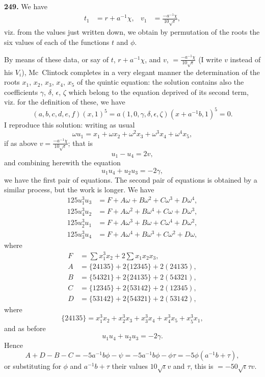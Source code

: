 \documentclass[12pt,a4paper]{article}
\theoremstyle{definition}
\begin{document}
\vspace{0.5em}

\noindent\textbf{249.} We have
\begin{align*}
t_1 &= r + a^{-1}\chi, & v_1 &= \frac{-a^{-1}\chi}{10\sqrt{\iota}},
\end{align*}
viz. from the values just written down, we obtain by permutation of the roots the six values of each of the functions $t$ and $\phi$.

By means of these data, or say of $t$, $r + a^{-1}\chi$, and $v$, $= \frac{-a^{-1}\chi}{10\sqrt{\iota}}$ (I write $v$ instead of his $V_i$), Mc~Clintock completes in a very elegant manner the determination of the roots $x_1$, $x_2$, $x_3$, $x_4$, $x_5$ of the quintic equation: the solution contains also the coefficients $\gamma$, $\delta$, $\epsilon$, $\zeta$ which belong to the equation deprived of its second term, viz. for the definition of these, we have
\[
(a, b, c, d, e, f)(x, 1)^5 = a(1, 0, \gamma, \delta, \epsilon, \zeta)(x + a^{-1}b, 1)^5 = 0.
\]
I reproduce this solution: writing as usual
\[
\omega u_1 = x_1 + \omega x_2 + \omega^2 x_3 + \omega^3 x_4 + \omega^4 x_5,
\]
if as above $v = \frac{-a^{-1}\chi}{10\sqrt{\iota}}$; that is
\[
u_1 - u_4 = 2v,\]
and combining herewith the equation
\[
u_1u_4 + u_2u_3 = -2\gamma,\]
we have the first pair of equations. The second pair of equations is obtained by a similar process, but the work is longer. We have
\begin{align*}
125 u_1^3u_3 &= F + A\omega + B\omega^2 + C\omega^3 + D\omega^4,\\
125 u_4^3u_2 &= F + A\omega^2 + B\omega^4 + C\omega + D\omega^3,\\
125 u_2^3u_1 &= F + A\omega^3 + B\omega + C\omega^4 + D\omega^2,\\
125 u_3^3u_4 &= F + A\omega^4 + B\omega^3 + C\omega^2 + D\omega,
\end{align*}
where
\begin{align*}
F &= \sum x_1^3x_2 + 2\sum x_1x_2x_3,\\
A &= \{24135\} + 2\{12345\} + 2(24135),\\
B &= \{54321\} + 2\{24135\} + 2(54321),\\
C &= \{12345\} + 2\{53142\} + 2(12345),\\
D &= \{53142\} + 2\{54321\} + 2(53142),
\end{align*}
where
\[
\{24135\} = x_1^3x_2 + x_2^3x_3 + x_3^3x_4 + x_4^3x_5 + x_5^3x_1,
\]
and as before
\[
u_1u_4 + u_2u_3 = -2\gamma.\]
Hence
\[
A + D - B - C = -5a^{-1}b\phi - \psi = -5a^{-1}b\phi - \phi\tau = -5\phi(a^{-1}b + \tau),
\]
or substituting for $\phi$ and $a^{-1}b + \tau$ their values $10\sqrt{\iota}v$ and $\tau$, this is $= -50\sqrt{\iota}\tau v$.
\end{document}
